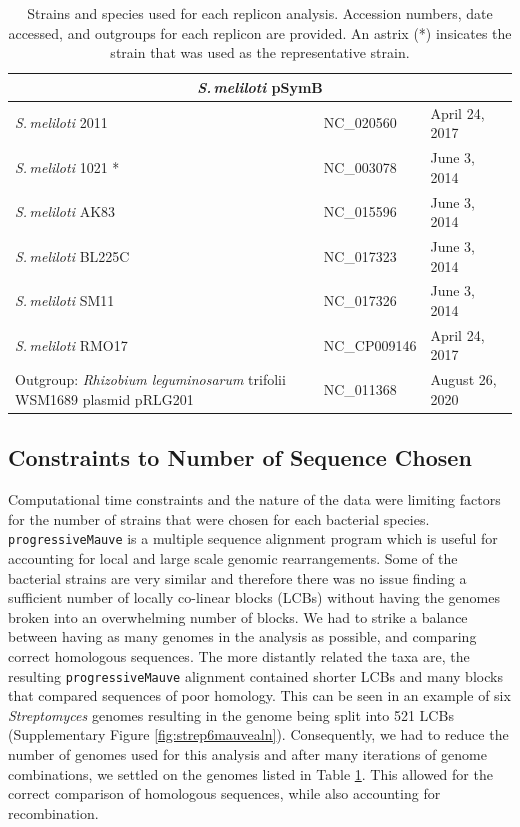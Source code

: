 \documentclass[11pt]{article}
\newcommand{\smel}{\textit{S.\,meliloti}\xspace}
\newcommand{\agrot}{\textit{Agrobacterium tumefaciens}\xspace}
\newcommand{\strep}{\textit{Streptomyces}\xspace}
\newcommand{\p}{\texttt{progressiveMauve}\xspace}
\newcommand{\rleg}{\textit{Rhizobium leguminosarum}\xspace}
\begin{document}
\begin{table}[H]
{\begin{minipage}{\textwidth}
\begin{tabular}{lll}
				\midrule
				\multicolumn{3}{c}{\smel pSymB} \\
				\midrule
				\smel 2011 & NC\_020560 & April 24, 2017\\
				\smel 1021 * & NC\_003078 & June 3, 2014\\
				\smel AK83 & NC\_015596 & June 3, 2014\\
				\smel BL225C & NC\_017323 & June 3, 2014\\
				\smel SM11 & NC\_017326 & June 3, 2014\\
				\smel RMO17 & NC\_CP009146 & April 24, 2017\\
				Outgroup: \rleg trifolii WSM1689 plasmid pRLG201 & NC\_011368 & August 26, 2020\\

				\bottomrule

				
			\end{tabular}
			\caption{\label{tab:seqdata} Strains and species used for each replicon analysis. Accession numbers, date accessed, and outgroups for each replicon are provided. An astrix (*) insicates the strain that was used as the representative strain.}
		\end{minipage}}
	\end{table}	

\subsection{Constraints to Number of Sequence Chosen}
Computational time constraints and the nature of the data were limiting factors for the number of strains that were chosen for each bacterial species.
\p is a multiple sequence alignment program which is useful for accounting for local and large scale genomic rearrangements. 
Some of the bacterial strains are very similar and therefore there was no issue finding a sufficient number of locally co-linear blocks (LCBs) without having the genomes broken into an overwhelming number of blocks.
We had to strike a balance between having as many genomes in the analysis as possible, and comparing correct homologous sequences.
The more distantly related the taxa are, the resulting \p alignment contained shorter LCBs and many blocks that compared sequences of poor homology.
This can be seen in an example of six \strep genomes resulting in the genome being split into 521 LCBs (Supplementary Figure \ref{fig:strep6mauvealn}).
Consequently, we had to reduce the number of genomes used for this analysis and after many iterations of genome combinations, we settled on the genomes listed in Table \ref{tab:seqdata}.
This allowed for the correct comparison of homologous sequences, while also accounting for recombination.
\end{document}
